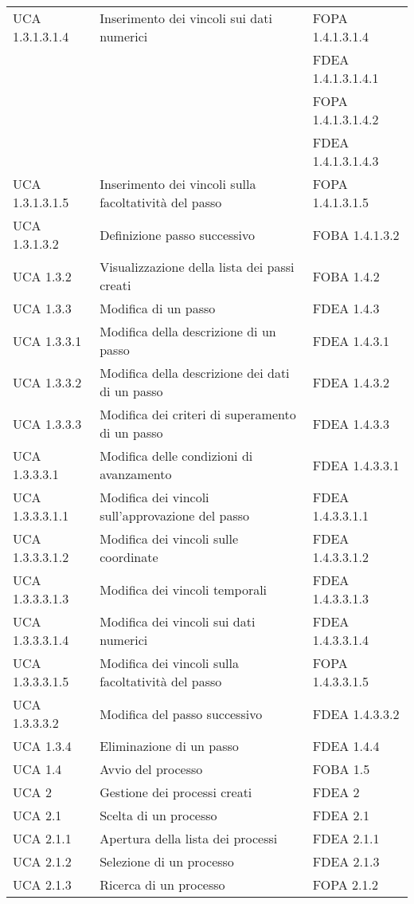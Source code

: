 \begin{longtable}{lXp{}}
\midrule
UCA 1.3.1.3.1.4&Inserimento dei vincoli sui dati numerici&FOPA 1.4.1.3.1.4\\
&&FDEA 1.4.1.3.1.4.1\\
&&FOPA 1.4.1.3.1.4.2\\
&&FDEA 1.4.1.3.1.4.3\\
\midrule
UCA 1.3.1.3.1.5&Inserimento dei vincoli sulla facoltatività del passo&FOPA 1.4.1.3.1.5\\
\midrule
UCA 1.3.1.3.2&Definizione passo successivo&FOBA 1.4.1.3.2\\
\midrule
UCA 1.3.2&Visualizzazione della lista dei passi creati&FOBA 1.4.2\\
\midrule
UCA 1.3.3&Modifica di un passo&FDEA 1.4.3\\
\midrule
UCA 1.3.3.1&Modifica della descrizione di un passo&FDEA 1.4.3.1\\
\midrule
UCA 1.3.3.2&Modifica della descrizione dei dati di un passo&FDEA 1.4.3.2\\
\midrule
UCA 1.3.3.3&Modifica dei criteri di superamento di un passo&FDEA 1.4.3.3\\
\midrule
UCA 1.3.3.3.1&Modifica delle condizioni di avanzamento&FDEA 1.4.3.3.1\\
\midrule
UCA 1.3.3.3.1.1&Modifica dei vincoli sull'approvazione del passo&FDEA 1.4.3.3.1.1\\
\midrule
UCA 1.3.3.3.1.2&Modifica dei vincoli sulle coordinate&FDEA 1.4.3.3.1.2\\
\midrule
UCA 1.3.3.3.1.3&Modifica dei vincoli temporali&FDEA 1.4.3.3.1.3\\
\midrule
UCA 1.3.3.3.1.4&Modifica dei vincoli sui dati numerici&FDEA 1.4.3.3.1.4\\
\midrule
UCA 1.3.3.3.1.5&Modifica dei vincoli sulla facoltatività del passo&FOPA 1.4.3.3.1.5\\
\midrule
UCA 1.3.3.3.2&Modifica del passo successivo&FDEA 1.4.3.3.2\\
\midrule
UCA 1.3.4&Eliminazione di un passo&FDEA 1.4.4\\
\midrule
UCA 1.4&Avvio del processo&FOBA 1.5\\
\midrule
UCA 2&Gestione dei processi creati&FDEA 2\\
\midrule
UCA 2.1&Scelta di un processo&FDEA 2.1\\
\midrule
UCA 2.1.1&Apertura della lista dei processi&FDEA 2.1.1\\
\midrule
UCA 2.1.2&Selezione di un processo&FDEA 2.1.3\\
\midrule
UCA 2.1.3&Ricerca di un processo&FOPA 2.1.2\\

\end{longtable}
